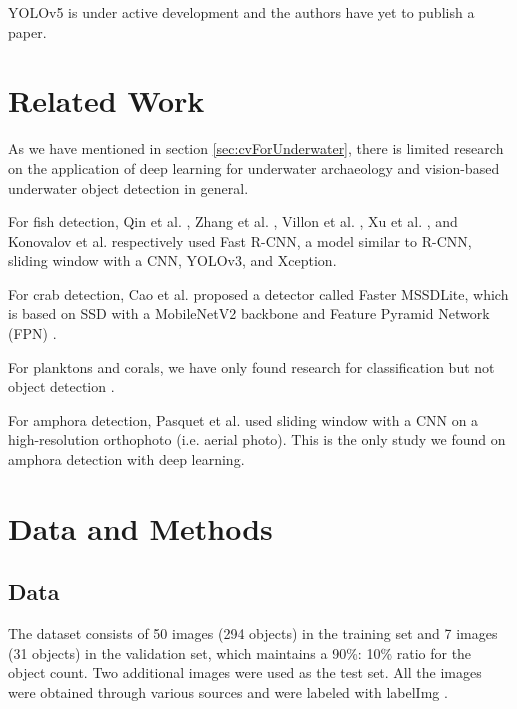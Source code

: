 \documentclass[a4paper, 11pt, oneside]{article}
\begin{document}
YOLOv5 \cite{yolov5} is under active development and the authors have yet to publish a paper.

\section{Related Work}

As we have mentioned in section \ref{sec:cvForUnderwater}, there is limited research on the application of deep learning
for underwater archaeology and vision-based underwater object detection in general.

For fish detection, Qin et al. \cite{qin2015underwater, li2015fast}, Zhang et al. \cite{zhang2016unsupervised},
Villon et al. \cite{villon2016coral}, Xu et al. \cite{xu2018underwater}, and Konovalov et al.
\cite{konovalov2019underwater} respectively used Fast R-CNN, a model similar to R-CNN, sliding window with a CNN,
YOLOv3, and Xception.

For crab detection, Cao et al. \cite{cao2020real} proposed a detector called Faster MSSDLite, which is based on SSD with
a MobileNetV2 backbone and Feature Pyramid Network (FPN) \cite{lin2017feature}.

For planktons and corals, we have only found research for classification but not object detection
\cite{qin2015underwater, moniruzzaman2017deep}.

For amphora detection, Pasquet et al. \cite{mccarthy20193d, pasquet2017amphora} used sliding window with a CNN on a
high-resolution orthophoto (i.e. aerial photo). This is the only study we found on amphora detection with deep learning.

\section{Data and Methods}

\subsection{Data}

The dataset consists of 50 images (294 objects) in the training set and 7 images (31 objects) in the validation set,
which maintains a 90\%: 10\% ratio for the object count. Two additional images were used as the test set. All the
images were obtained through various sources
\cite{googleimages, scuba, itinari, whoi, phoenician, auscape, hakai, groplan, ionian, sanisera} and were labeled
with labelImg \cite{labelimg}.
\end{document}
